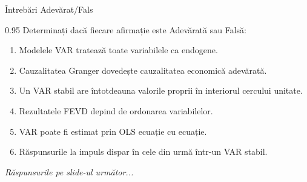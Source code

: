 \documentclass[9pt, aspectratio=169, t]{beamer}
\begin{document}
\begin{frame}{Întrebări Adevărat/Fals}
    \begin{cminipage}{0.95\textwidth}
    Determinați dacă fiecare afirmație este Adevărată sau Falsă:

    \vspace{0.3cm}
    \begin{enumerate}\setlength{\itemsep}{0pt}
        \item Modelele VAR tratează toate variabilele ca endogene.
        \item Cauzalitatea Granger dovedește cauzalitatea economică adevărată.
        \item Un VAR stabil are întotdeauna valorile proprii în interiorul cercului unitate.
        \item Rezultatele FEVD depind de ordonarea variabilelor.
        \item VAR poate fi estimat prin OLS ecuație cu ecuație.
        \item Răspunsurile la impuls dispar în cele din urmă într-un VAR stabil.
    \end{enumerate}

    \vspace{0.3cm}
    \begin{flushright}\textit{Răspunsurile pe slide-ul următor...}\end{flushright}
    \end{cminipage}
\end{frame}
\end{document}
